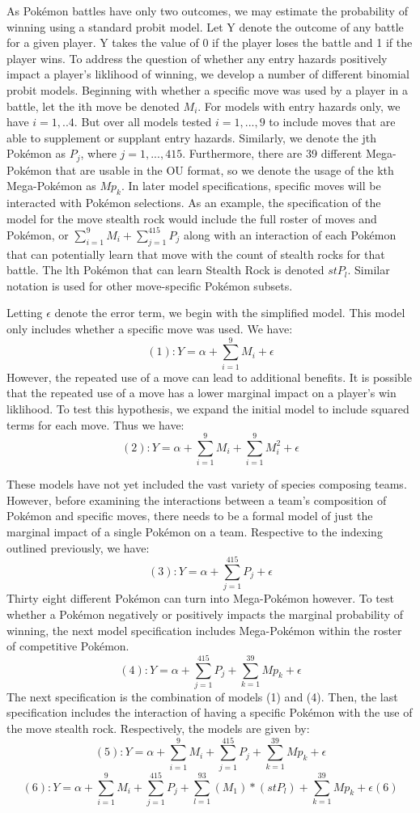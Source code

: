 \documentclass[12pt,twoside]{reedthesis}
\begin{document}
  As Pokémon battles have only two outcomes, we may estimate the
  probability of winning using a standard probit model. Let Y denote the
  outcome of any battle for a given player. Y takes the value of 0 if the
  player loses the battle and 1 if the player wins. To address the
  question of whether any entry hazards positively impact a player's
  liklihood of winning, we develop a number of different binomial probit
  models. Beginning with whether a specific move was used by a player in a
  battle, let the ith move be denoted \(M_i\). For models with entry
  hazards only, we have \(i=1,..4\). But over all models tested
  \(i=1,...,9\) to include moves that are able to supplement or supplant
  entry hazards. Similarly, we denote the jth Pokémon as \(P_j\), where
  \(j=1,...,415\). Furthermore, there are 39 different Mega-Pokémon that
  are usable in the OU format, so we denote the usage of the kth
  Mega-Pokémon as \(Mp_k\). In later model specifications, specific moves
  will be interacted with Pokémon selections. As an example, the
  specification of the model for the move stealth rock would include the
  full roster of moves and Pokémon, or
  \(\sum_{i=1}^{9} M_i + \sum_{j=1}^{415} P_j\) along with an interaction
  of each Pokémon that can potentially learn that move with the count of
  stealth rocks for that battle. The lth Pokémon that can learn Stealth
  Rock is denoted \(stP_l\). Similar notation is used for other
  move-specific Pokémon subsets.
  
  Letting \(\epsilon\) denote the error term, we begin with the simplified
  model. This model only includes whether a specific move was used. We
  have: \[(1): Y = \alpha + \sum_{i=1}^{9} M_i + \epsilon \] However, the
  repeated use of a move can lead to additional benefits. It is possible
  that the repeated use of a move has a lower marginal impact on a
  player's win liklihood. To test this hypothesis, we expand the initial
  model to include squared terms for each move. Thus we have:
  \[(2): Y = \alpha + \sum_{i=1}^{9} M_i + \sum_{i=1}^{9} M_i^2 + \epsilon \]
  
  These models have not yet included the vast variety of species composing
  teams. However, before examining the interactions between a team's
  composition of Pokémon and specific moves, there needs to be a formal
  model of just the marginal impact of a single Pokémon on a team.
  Respective to the indexing outlined previously, we have:
  \[(3): Y = \alpha + \sum_{j=1}^{415} P_j + \epsilon \] Thirty eight
  different Pokémon can turn into Mega-Pokémon however. To test whether a
  Pokémon negatively or positively impacts the marginal probability of
  winning, the next model specification includes Mega-Pokémon within the
  roster of competitive Pokémon.
  \[(4): Y = \alpha + \sum_{j=1}^{415} P_j + \sum_{k=1}^{39} Mp_k + \epsilon \]
  The next specification is the combination of models (1) and (4). Then,
  the last specification includes the interaction of having a specific
  Pokémon with the use of the move stealth rock. Respectively, the models
  are given by:
  \[(5): Y = \alpha + \sum_{i=1}^{9} M_i + \sum_{j=1}^{415} P_j + \sum_{k=1}^{39} Mp_k + \epsilon \]
  \[(6): Y = \alpha + \sum_{i=1}^{9} M_i + \sum_{j=1}^{415} P_j + \sum_{l=1}^{93} (M_1)*(stP_l)+ \sum_{k=1}^{39} Mp_k + \epsilon (6)\]
  
\end{document}
